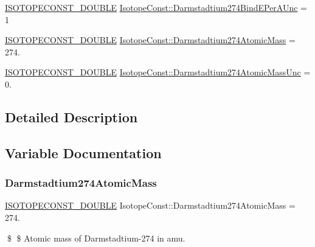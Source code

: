 \begin{DoxyCompactItemize}
\item 
\mbox{\hyperlink{group___isotope_const-_macros_ga8f45a7272ce02c0b4c65c44636ed719a}{I\+S\+O\+T\+O\+P\+E\+C\+O\+N\+S\+T\+\_\+\+D\+O\+U\+B\+LE}} \mbox{\hyperlink{group___isotope_const-_darmstadtium-_ds274_gaa9d25effede4e7ccd414800e6f14abc6}{Isotope\+Const\+::\+Darmstadtium274\+Bind\+E\+Per\+A\+Unc}} = 1
\item 
\mbox{\hyperlink{group___isotope_const-_macros_ga8f45a7272ce02c0b4c65c44636ed719a}{I\+S\+O\+T\+O\+P\+E\+C\+O\+N\+S\+T\+\_\+\+D\+O\+U\+B\+LE}} \mbox{\hyperlink{group___isotope_const-_darmstadtium-_ds274_ga7b87159ef3546d1a03f81050506faf7d}{Isotope\+Const\+::\+Darmstadtium274\+Atomic\+Mass}} = 274.
\item 
\mbox{\hyperlink{group___isotope_const-_macros_ga8f45a7272ce02c0b4c65c44636ed719a}{I\+S\+O\+T\+O\+P\+E\+C\+O\+N\+S\+T\+\_\+\+D\+O\+U\+B\+LE}} \mbox{\hyperlink{group___isotope_const-_darmstadtium-_ds274_ga18c45cc38c343c0062b4c7bc51ddd2a8}{Isotope\+Const\+::\+Darmstadtium274\+Atomic\+Mass\+Unc}} = 0.
\end{DoxyCompactItemize}


\subsection{Detailed Description}


\subsection{Variable Documentation}
\mbox{\label{group___isotope_const-_darmstadtium-_ds274_ga7b87159ef3546d1a03f81050506faf7d}} 
\subsubsection{\texorpdfstring{Darmstadtium274\+Atomic\+Mass}{Darmstadtium274AtomicMass}}
{\footnotesize\ttfamily \mbox{\hyperlink{group___isotope_const-_macros_ga8f45a7272ce02c0b4c65c44636ed719a}{I\+S\+O\+T\+O\+P\+E\+C\+O\+N\+S\+T\+\_\+\+D\+O\+U\+B\+LE}} Isotope\+Const\+::\+Darmstadtium274\+Atomic\+Mass = 274.}

\$ \$ Atomic mass of Darmstadtium-\/274 in amu. \mbox{\label{group___isotope_const-_darmstadtium-_ds274_ga18c45cc38c343c0062b4c7bc51ddd2a8}} 
